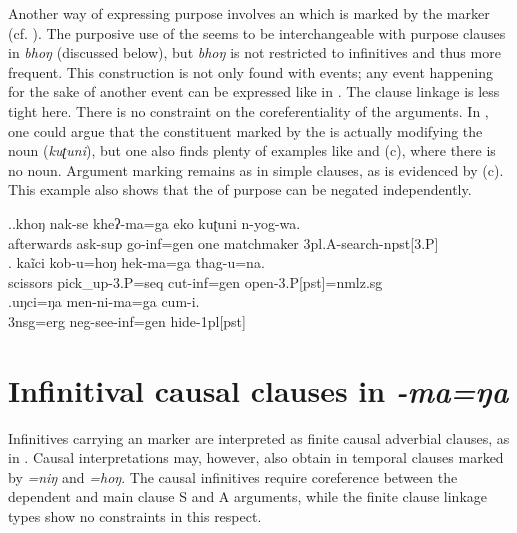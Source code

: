 Another way of expressing purpose involves an  which is marked by the  marker (cf. ). The purposive use of the  seems to be interchangeable with purpose clauses in \emph{bhoŋ} (discussed below), but \emph{bhoŋ} is not restricted to infinitives and thus more frequent. This construction is not only found with  events; any event happening for the sake of another event can be expressed like in \Next. The clause linkage is less tight here. There is no constraint on the coreferentiality of the arguments. In \Next[a], one could argue that the constituent marked by the  is actually modifying the noun (\emph{kuʈuni}), but one also finds plenty of examples like \Next[b] and (c), where there is no noun. Argument marking remains as in simple clauses, as is evidenced by (c). This example also shows that the  of purpose can be negated independently.

\ex.\ag.khoŋ nak-se kheʔ-ma=ga eko kuʈuni n-yog-wa.\\
afterwards ask{\sc -sup}  go{\sc -inf=gen} one matchmaker {\sc 3pl.A-}search{\sc -npst[3.P]}\\
 
\bg. kaĩci kob-u=hoŋ hek-ma=ga thag-u=na.\\
scissors   pick\_up{\sc -3.P=seq} cut{\sc -inf=gen} open{\sc -3.P[pst]=nmlz.sg}\\
  
\bg.uŋci=ŋa men-ni-ma=ga cum-i.\\
{\sc 3nsg=erg} {\sc neg-}see{\sc -inf=gen} hide{\sc -1pl[pst]}\\
		
		
\section{Infinitival causal clauses in \emph{-ma=ŋa}}\label{manga}

Infinitives carrying an  marker are interpreted as finite causal adverbial clauses, as in \Next. Causal interpretations may, however, also obtain in temporal clauses marked by \emph{=niŋ} and \emph{=hoŋ}. The causal infinitives require coreference between the dependent and main clause S and A arguments, while the finite clause linkage types show no constraints in this respect.

